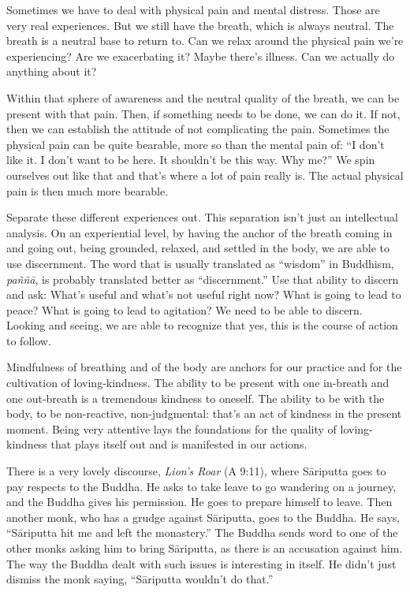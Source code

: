 Sometimes we have to deal with physical pain and mental distress. Those
are very real experiences. But we still have the breath, which is always
neutral. The breath is a neutral base to return to. Can we relax around
the physical pain we’re experiencing? Are we exacerbating it? Maybe
there’s illness. Can we actually do anything about it?

Within that sphere of awareness and the neutral quality of the breath,
we can be present with that pain. Then, if something needs to be done,
we can do it. If not, then we can establish the attitude of not
complicating the pain. Sometimes the physical pain can be quite
bearable, more so than the mental pain of: “I don’t like it. I don’t
want to be here. It shouldn’t be this way. Why me?” We spin ourselves
out like that and that’s where a lot of pain really is. The actual
physical pain is then much more bearable.

Separate these different experiences out. This separation isn’t just an
intellectual analysis. On an experiential level, by having the anchor of
the breath coming in and going out, being grounded, relaxed, and settled
in the body, we are able to use discernment. The word that is usually
translated as “wisdom” in Buddhism, \emph{paññā}, is probably translated
better as “discernment.” Use that ability to discern and ask: What’s
useful and what’s not useful right now? What is going to lead to peace?
What is going to lead to agitation? We need to be able to discern.
Looking and seeing, we are able to recognize that yes, this is the
course of action to follow.

Mindfulness of breathing and of the body are anchors for our practice
and for the cultivation of loving-kindness. The ability to be present
with one in-breath and one out-breath is a tremendous kindness to
oneself. The ability to be with the body, to be non-reactive,
non-judgmental: that’s an act of kindness in the present moment. Being
very attentive lays the foundations for the quality of loving-kindness
that plays itself out and is manifested in our actions.

There is a very lovely discourse, \emph{Lion's Roar} (A 9:11), where
Sāriputta goes to pay respects to the Buddha. He asks to take leave to
go wandering on a journey, and the Buddha gives his permission. He goes
to prepare himself to leave. Then another monk, who has a grudge against
Sāriputta, goes to the Buddha. He says, “Sāriputta hit me and left the
monastery.” The Buddha sends word to one of the other monks asking him
to bring Sāriputta, as there is an accusation against him. The way the
Buddha dealt with such issues is interesting in itself. He didn’t just
dismiss the monk saying, “Sāriputta wouldn’t do that.”

